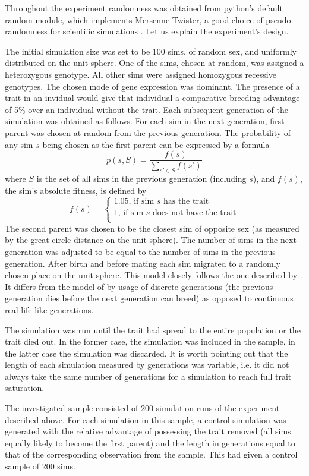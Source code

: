 \documentclass{l4proj}
\begin{document}
Throughout the experiment randomness was obtained from python's default random module, which implements Mersenne Twister, a good choice of pseudo-randomness for scientific simulations \parencite{Matsumoto98}. Let us explain the experiment's design.

The initial simulation size was set to be 100 sims, of random sex, and uniformly distributed on the unit sphere. One of the sims, chosen at random, was assigned a \gls{heterozygous} genotype. All other sims were assigned \gls{homozygous} recessive genotypes. The chosen mode of gene expression was \gls{dominant}. The presence of a trait in an invidual would give that individual a comparative breeding advantage of 5\% over an individual without the trait. Each subsequent generation of the simulation was obtained as follows. For each sim in the next generation, first parent was chosen at random from the previous generation. The probability of any sim $s$ being chosen as the first parent can be expressed by a formula
$$p(s, S) = \frac{f(s)}{\sum_{s' \in S}^{}f(s')}$$
where $S$ is the set of all sims in the previous generation (including $s$), and $f(s)$, the sim's absolute fitness, is defined by
$$
f(s) = \begin{cases}
  1.05 \text{, if sim $s$ has the trait} \\
  1 \text{, if sim $s$ does not have the trait} \\
\end{cases}
$$
The second parent was chosen to be the closest sim of opposite sex (as measured by the great circle distance on the unit sphere). The number of sims in the next generation was adjusted to be equal to the number of sims in the previous generation. After birth and before mating each sim migrated to a randomly chosen place on the unit sphere. This model closely follows the one described by \cite{peng10}. It differs from the model of \cite{rohde04} by usage of discrete generations (the previous generation dies before the next generation can breed) as opposed to continuous real-life like generations.

The simulation was run until the trait had spread to the entire population or the trait died out. In the former case, the simulation was included in the sample, in the latter case the simulation was discarded. It is worth pointing out that the length of each simulation measured by generations was variable, i.e. it did not always take the same number of generations for a simulation to reach full trait saturation.

The investigated sample consisted of 200 simulation runs of the experiment described above. For each simulation in this sample, a control simulation was generated with the relative advantage of possessing the trait removed (all sims equally likely to become the first parent) and the length in generations equal to that of the corresponding observation from the sample. This had given a control sample of 200 sims.
\end{document}
